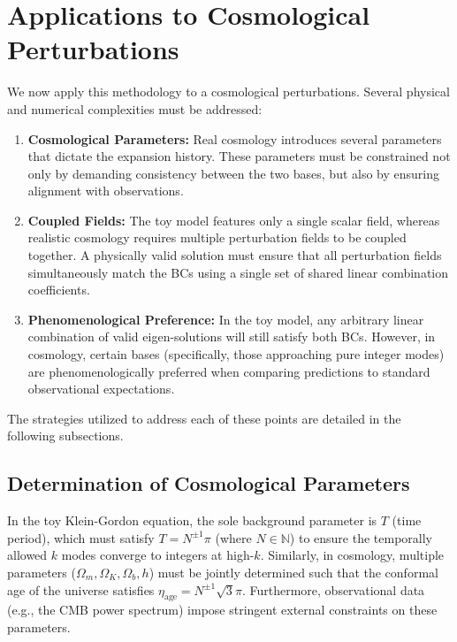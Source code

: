 \section{Applications to Cosmological Perturbations}\label{sec:real_cosmology_lowk}

We now apply this methodology to a cosmological perturbations. Several physical and numerical complexities must be addressed:

\begin{enumerate}
    \item \textbf{Cosmological Parameters:} Real cosmology introduces several parameters that dictate the expansion history. These parameters must be constrained not only by demanding consistency between the two bases, but also by ensuring alignment with observations.
    \item \textbf{Coupled Fields:} The toy model features only a single scalar field, whereas realistic cosmology requires multiple perturbation fields to be coupled together. A physically valid solution must ensure that all perturbation fields simultaneously match the BCs using a single set of shared linear combination coefficients.
    \item \textbf{Phenomenological Preference:} In the toy model, any arbitrary linear combination of valid eigen-solutions will still satisfy both BCs. However, in cosmology, certain bases (specifically, those approaching pure integer modes) are phenomenologically preferred when comparing predictions to standard observational expectations. 
\end{enumerate}

The strategies utilized to address each of these points are detailed in the following subsections.

\subsection{Determination of Cosmological Parameters}

In the toy Klein-Gordon equation, the sole background parameter is $T$ (time period), which must satisfy $T=N^{\pm 1}\pi$ (where $N\in\mathbb{N}$) to ensure the temporally allowed $k$ modes converge to integers at high-$k$. Similarly, in cosmology, multiple parameters ($\Omega_m, \Omega_K, \Omega_b, h$) must be jointly determined such that the conformal age of the universe satisfies $\eta_{\text{age}}= N^{\pm1}\sqrt{3}\pi$. Furthermore, observational data (e.g., the CMB power spectrum) impose stringent external constraints on these parameters. 

